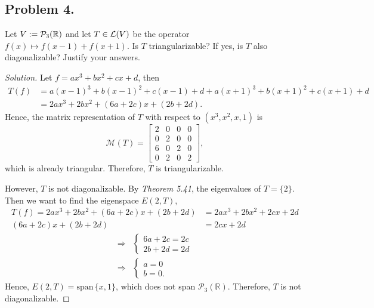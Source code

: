 \documentclass{article}
\newcommand*{\spann}{\ensuremath{\mathrm{span}}\,}
\renewcommand*{\implies}{\ensuremath{\Longrightarrow}}
\newcommand*{\R}{\ensuremath{\mathbb{R}}}
\newcommand*{\p}{\ensuremath{\mathcal{P}}}
\begin{document}
\subsection*{Problem 4.}
Let $V := {\cal P}_3(\R)$ and let $T\in {\cal L}(V)$ be the operator $f(x)\mapsto f(x-1)+f(x+1)$. 
Is $T$ triangularizable? If yes, is $T$ also diagonalizable? Justify your answers.
\begin{proof}[Solution]
    Let $f = ax^3 + bx^2 + cx + d$, then 
    \begin{align*}
        T(f) & = a(x-1)^3 + b(x-1)^2 + c(x-1) + d + a(x+1)^3 + b(x+1)^2 + c(x+1) + d \\
        & = 2ax^3 + 2bx^2 + (6a + 2c)x + (2b+2d).
    \end{align*}
    Hence, the matrix representation of $T$ with respect to $(x^3,x^2,x,1)$ is
    $$\mathcal{M}(T) = \begin{bmatrix}
        2 & 0 & 0 & 0 \\
        0 & 2 & 0 & 0 \\
        6 & 0 & 2 & 0 \\
        0 & 2 & 0 & 2
    \end{bmatrix},$$
    which is already triangular. Therefore, $T$ is triangularizable. 
    
    However, $T$ is not diagonalizable. By \emph{Theorem 5.41}, the eigenvalues of $T=\{2\}$. 
    Then we want to find the eigenspace $E(2,T)$,
    \begin{align*}
        T(f) = 2ax^3 + 2bx^2 + (6a + 2c)x + (2b+2d) & = 2ax^3 + 2bx^2 + 2cx + 2d \\
        (6a+2c)x + (2b + 2d) & = 2cx + 2d
    \end{align*}
    \begin{align*}
        \implies & \begin{cases}
            6a + 2c = 2c \\
            2b + 2d = 2d
        \end{cases} \\
        \implies & \begin{cases}
            a = 0 \\
            b = 0.
        \end{cases}
    \end{align*}
    Hence, $E(2,T) = \spann\{x, 1\}$, which does not span $\p_3(\R)$. Therefore, 
    $T$ is not diagonalizable.
\end{proof}

\newpage
\end{document}
